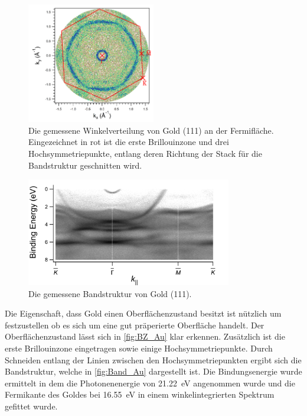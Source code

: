         \begin{figure}
            \centering
            \includegraphics[width=0.5\textwidth]{./content/pictures/Au/BZ_Au.png}
            \caption{Die gemessene Winkelverteilung von Gold (111) an der Fermifläche.
            Eingezeichnet in rot ist die erste Brillouinzone und drei Hochsymmetriepunkte, entlang deren Richtung der Stack für die Bandstruktur geschnitten wird.}
            \label{fig:BZ_Au}
        \end{figure}
        \begin{figure}
            \centering
            \includegraphics[width=0.8\textwidth]{./content/pictures/Au/Band_Au111.png}
            \caption{Die gemessene Bandstruktur von Gold (111).}
            \label{fig:Band_Au}
        \end{figure}
        Die Eigenschaft, dass Gold einen Oberflächenzustand besitzt ist nützlich um festzustellen ob es sich um eine gut präperierte Oberfläche handelt.
        Der Oberflächenzustand lässt sich in \autoref{fig:BZ_Au} klar erkennen.
        Zusätzlich ist die erste Brillouinzone eingetragen sowie einige Hochsymmetriepunkte.
        Durch Schneiden entlang der Linien zwischen den Hochsymmetriepunkten ergibt sich die Bandstruktur, welche in \autoref{fig:Band_Au} dargestellt ist.
        Die Bindungsenergie wurde ermittelt in dem die Photonenenergie von \SI{21.22}{\electronvolt} angenommen wurde und die Fermikante des Goldes bei \SI{16.55}{\electronvolt} in einem winkelintegrierten Spektrum gefittet wurde.
